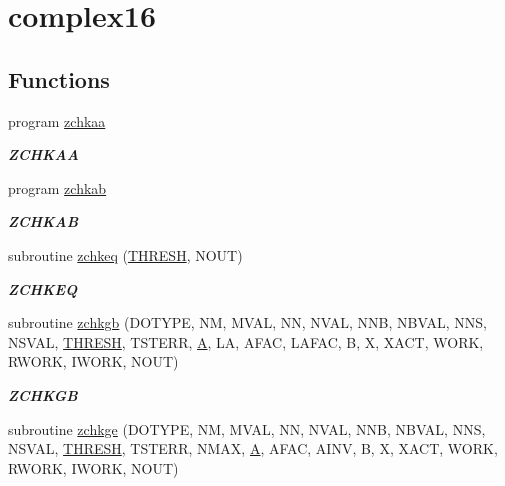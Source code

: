 \hypertarget{group__complex16__lin}{}\section{complex16}
\label{group__complex16__lin}
\subsection*{Functions}
\begin{DoxyCompactItemize}
\item 
program \hyperlink{group__complex16__lin_ga25109e0598738760709f81202f3fd7ce}{zchkaa}
\begin{DoxyCompactList}\small\item\em {\bfseries Z\+C\+H\+K\+A\+A} \end{DoxyCompactList}\item 
program \hyperlink{group__complex16__lin_ga9dbe809c934600057831d761bc2fa7db}{zchkab}
\begin{DoxyCompactList}\small\item\em {\bfseries Z\+C\+H\+K\+A\+B} \end{DoxyCompactList}\item 
subroutine \hyperlink{group__complex16__lin_ga819d29b02b894f37d095fcc80ed817c7}{zchkeq} (\hyperlink{zlaqgs_8c_a0656018abfc9fa2821827415f5d5ea57}{T\+H\+R\+E\+S\+H}, N\+O\+U\+T)
\begin{DoxyCompactList}\small\item\em {\bfseries Z\+C\+H\+K\+E\+Q} \end{DoxyCompactList}\item 
subroutine \hyperlink{group__complex16__lin_gaf2928006d3d5c16f92c6302bbdaece61}{zchkgb} (D\+O\+T\+Y\+P\+E, N\+M, M\+V\+A\+L, N\+N, N\+V\+A\+L, N\+N\+B, N\+B\+V\+A\+L, N\+N\+S, N\+S\+V\+A\+L, \hyperlink{zlaqgs_8c_a0656018abfc9fa2821827415f5d5ea57}{T\+H\+R\+E\+S\+H}, T\+S\+T\+E\+R\+R, \hyperlink{classA}{A}, L\+A, A\+F\+A\+C, L\+A\+F\+A\+C, B, X, X\+A\+C\+T, W\+O\+R\+K, R\+W\+O\+R\+K, I\+W\+O\+R\+K, N\+O\+U\+T)
\begin{DoxyCompactList}\small\item\em {\bfseries Z\+C\+H\+K\+G\+B} \end{DoxyCompactList}\item 
subroutine \hyperlink{group__complex16__lin_gaec0ecb16c8bae1ddd817e10a2137d82d}{zchkge} (D\+O\+T\+Y\+P\+E, N\+M, M\+V\+A\+L, N\+N, N\+V\+A\+L, N\+N\+B, N\+B\+V\+A\+L, N\+N\+S, N\+S\+V\+A\+L, \hyperlink{zlaqgs_8c_a0656018abfc9fa2821827415f5d5ea57}{T\+H\+R\+E\+S\+H}, T\+S\+T\+E\+R\+R, N\+M\+A\+X, \hyperlink{classA}{A}, A\+F\+A\+C, A\+I\+N\+V, B, X, X\+A\+C\+T, W\+O\+R\+K, R\+W\+O\+R\+K, I\+W\+O\+R\+K, N\+O\+U\+T)

\end{DoxyCompactItemize}
